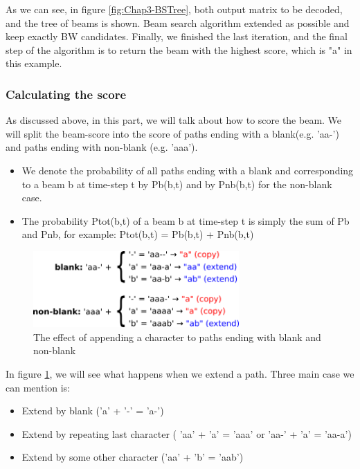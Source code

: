 As we can see, in figure \ref{fig:Chap3-BSTree}, both output matrix to be decoded, and the tree of beams is shown. Beam search algorithm extended as possible and keep exactly BW candidates. Finally, we finished the last iteration, and the final step of the algorithm is to return the beam with the highest score, which is "a" in this example.

\subsubsection{Calculating the score}

As discussed above, in this part, we will talk about how to score the beam. We will split the beam-score into the score of paths ending with a blank(e.g. 'aa-') and paths ending with non-blank (e.g. 'aaa').

\begin{itemize}
	\item We denote the probability of all paths ending with a blank and corresponding to a beam b at time-step t
	      by Pb(b,t) and by Pnb(b,t) for the non-blank case.
	\item The probability Ptot(b,t) of a beam b at time-step t is simply the sum of Pb and Pnb, for example:
	      Ptot(b,t) = Pb(b,t) + Pnb(b,t)
\end{itemize}

\begin{figure}[H]
	\centering
	\includegraphics[width=0.7\textwidth]{img/Chap3/CTC_Scoring}
	\caption{ The effect of appending a character to paths ending with blank and non-blank }
	\label{fig:Chap3-CTC_Scoring}
\end{figure}

In figure \ref{fig:Chap3-CTC_Scoring}, we will see what happens when we extend a path. Three main case we can mention
is:
\begin{itemize}
	\item Extend by blank ('a' + '-' = 'a-')
	\item Extend by repeating last character ( 'aa' + 'a' = 'aaa' or 'aa-' + 'a' = 'aa-a')
	\item Extend by some other character ('aa' + 'b' = 'aab')
\end{itemize}

